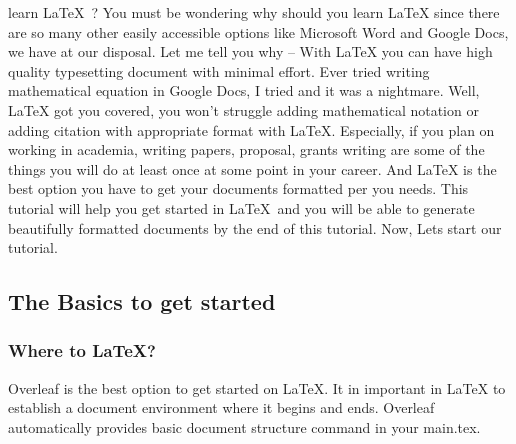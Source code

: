 \documentclass[12pt,journal,compsoc]{IEEEtran}
\begin{document}
 learn \LaTeX\ {?} You must be wondering why should you learn LaTeX since there are so many other easily accessible options like Microsoft Word and Google Docs, we have at our disposal. Let me tell you why -- With LaTeX you can have high quality typesetting document with minimal effort. Ever tried writing mathematical equation in Google Docs, I tried and it was a nightmare. Well, LaTeX got you covered, you won't struggle adding mathematical notation or adding citation with appropriate format with LaTeX. Especially, if you plan on working in academia, writing papers, proposal, grants writing are some of the things you will do at least once at some point in your career. And LaTeX is the best option you have to get your documents formatted per you needs. This tutorial will help you get started in \LaTeX\ and you will be able to generate beautifully formatted documents by the end of this tutorial. Now, Lets start our tutorial.


 

\subsection{The Basics to get started}



\subsubsection{Where to LaTeX?}
Overleaf is the best option to get started on LaTeX. It in important in LaTeX to establish a document environment where it begins and ends. Overleaf automatically provides basic document structure command in your main.tex.
\end{document}
